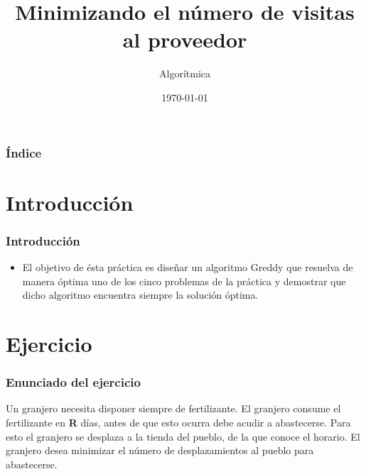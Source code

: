 \documentclass{beamer}
\title[Practica 3]{Minimizando el número de visitas al proveedor} %
\author{Algorítmica} %
\institute[UGR] %
{
Universidad de Granada \\ %
\medskip

}
\date{\today} %
\begin{document}
\begin{frame}
\titlepage %
\end{frame}

\begin{frame}
\frametitle{Índice} %
\tableofcontents %
\end{frame}


\section{Introducción }
\begin{frame}
	\frametitle{Introducción}
	\begin{itemize}
		\item El objetivo de ésta práctica es diseñar un algoritmo Greddy que resuelva de manera óptima uno de los cinco problemas de la práctica y demostrar que dicho algoritmo encuentra siempre la solución óptima.
	\end{itemize}
\end{frame}


\section{Ejercicio} 
\begin{frame}
	\frametitle{Enunciado del ejercicio}
	Un granjero necesita disponer siempre de fertilizante. El granjero consume el fertilizante en \textbf{R} días, antes de que esto ocurra debe acudir a abastecerse. Para esto el granjero se desplaza a la tienda del pueblo, de la que conoce el horario. El granjero desea minimizar el número de desplazamientos al pueblo para abastecerse.
	
\end{frame}
\end{document}
